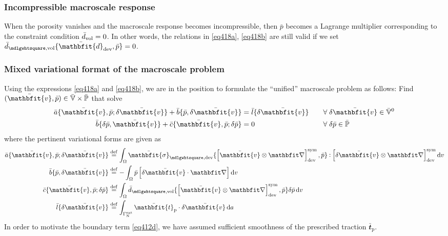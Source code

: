 \documentclass[10pt,a4paper,fleqn]{article}
\renewcommand{\ta}[1]{\mathbfit{#1}}
\renewcommand{\ts}[1]{\mathbfit{#1}}
\renewcommand{\Box}{\mdlgwhtsquare}
\newcommand{\prescribed}{\mathrm{p}}
\newcommand{\external}{\mathrm{ext}}
\begin{document}
\subsubsection{Incompressible macroscale response}

When the porosity vanishes and the macroscale response becomes incompressible, then $\bar{p}$ becomes a Lagrange multiplier corresponding to the constraint condition $\bar{d}_{\mathrm{vol}} = 0$. In other words, the relations in \eqref{eq418a}, \eqref{eq418b} are still valid if we set $\bar{d}_{\Box,\vol}\{\bar{\ts d}_\dev,\bar p\} = 0$.

\subsubsection{Mixed variational format of the macroscale problem}

Using the expressions \eqref{eq418a} and \eqref{eq418b}, we are in the position to formulate the ``unified'' macroscale problem as follows: Find $(\bar{\ta v},\bar p) \in\bar{\set V}\times\bar{\set{P}}$ that solve
\begin{subequations}\label{eq411}
\begin{align}
 \bar a\{\bar{\ta v},\bar p; \delta\bar{\ta v}\} + \bar b\{\bar p, \delta\bar{\ta v}\} &= \bar l\{\delta\bar{\ta v}\}   &&\quad \forall\; \delta\bar{\ta v} \in \bar{\set{V}}^0
 \label{eq411a}\\
 \bar b\{\delta\bar p, \bar{\ta v}\} + \bar c\{\bar{\ta v}, \bar p; \delta\bar p\}&= 0   &&\quad \forall\; \delta\bar p \in \bar{\set{P}}
 \label{eq411b}
\end{align}
\end{subequations}
where the pertinent variational forms are given as
\begin{align}
 \bar a\{\bar{\ta v},\bar p; \delta\bar{\ta v}\} &\defeq \int_\Omega \bar{\ts\sigma}_{\Box,\dev}\{\left[\bar{\ta v}\outerp \diff\right]^\sym_\dev,\bar p\}\dprod \left[\delta\bar{\ta v}\outerp \diff\right]^\sym_\dev \dif v
 \label{eq412a}\\
 \bar b\{\bar p, \delta\bar{\ta v}\}             &\defeq -\int_\Omega \bar p\left[\delta\bar{\ta v}\cdot\diff\right]\dif v
 \label{eq412b}\\
 \bar c\{\bar{\ta v}, \bar p; \delta\bar p\}     &\defeq \int_\Omega \bar d_{\Box,\vol}\{\left[\bar{\ta v}\outerp \diff\right]^\sym_\dev,\bar p\}\delta\bar p\dif v
 \label{eq412c}\\
 \bar l\{\delta\bar {\ta v}\}               &\defeq \int_{\Gamma^\external_\Neumann} \bar{\ta t}_\prescribed\cdot \delta\bar{\ta v} \dif a
 \label{eq412d}
\end{align}
In order to motivate the boundary term \eqref{eq412d}, we have assumed sufficient smoothness of the prescribed traction $\bar{\ta t}_\prescribed$.
\end{document}
